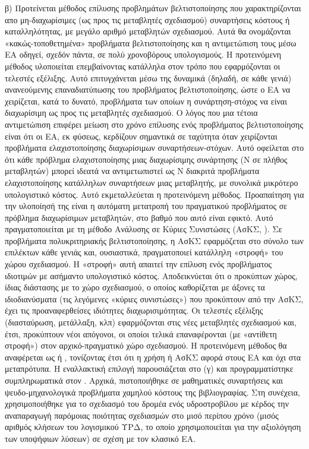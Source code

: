 	β)  Προτείνεται μέθοδος επίλυσης προβλημάτων βελτιστοποίησης που χαρακτηρίζονται απο μη-διαχωρίσιμες (ως προς τις μεταβλητές σχεδιασμού) συναρτήσεις κόστους ή καταλληλότητας, με μεγάλο αριθμό μεταβλητών σχεδιασμού. Αυτά θα ονομάζονται «κακώς-τοποθετημένα» προβλήματα βελτιστοποίησης και η αντιμετώπιση τους μέσω ΕΑ οδηγεί, σχεδόν πάντα, σε πολύ χρονοβόρους υπολογισμούς. Η προτεινόμενη μέθοδος υλοποιείται επεμβαίνοντας κατάλληλα στον τρόπο που εφαρμόζονται οι τελεστές εξέλιξης.  Αυτό επιτυγχάνεται μέσω της δυναμικά (δηλαδή, σε κάθε γενιά) ανανεούμενης επαναδιατύπωσης του προβλήματος βελτιστοποίησης, ώστε ο ΕΑ να χειρίζεται, κατά το δυνατό, προβλήματα των οποίων η συνάρτηση-στόχος να είναι διαχωρίσιμη ως προς τις μεταβλητές σχεδιασμού. Ο λόγος που μια τέτοια αντιμετώπιση επιφέρει μείωση στο χρόνο επίλυσης ενός προβλήματος βελτιστοποίησης είναι ότι οι ΕΑ, εκ φύσεως, κερδίζουν σημαντικά σε ταχύτητα όταν χειρίζονται προβλήματα ελαχιστοποίησης διαχωρίσιμων συναρτήσεων-στόχων. Αυτό οφείλεται στο ότι κάθε πρόβλημα ελαχιστοποίησης μιας διαχωρίσιμης συνάρτησης (Ν σε πλήθος μεταβλητών) μπορεί ιδεατά να αντιμετωπιστεί ως Ν διακριτά προβλήματα ελαχιστοποίησης κατάλληλων συναρτήσεων μιας μεταβλητής, με συνολικά μικρότερο υπολογιστικό κόστος.  Αυτό εκμεταλλεύεται η προτεινόμενη μέθοδος. Προαπαίτηση για την υλοποίησή της είναι η αυτόματη μετατροπή του πραγματικού προβλήματος σε πρόβλημα διαχωρίσιμων μεταβλητών, στο βαθμό που αυτό είναι εφικτό. Αυτό πραγματοποιείται με τη μέθοδο Ανάλυσης σε Κύριες Συνιστώσες \cite{Haykin,Jolliffe_2002} (ΑσΚΣ, ). Σε προβλήματα πολυκριτηριακής βελτιστοποίησης, η ΑσΚΣ εφαρμόζεται στο σύνολο των επιλέκτων κάθε γενιάς και, ουσιαστικά, πραγματοποιεί κατάλληλη «στροφή» του χώρου σχεδιασμού. Η «στροφή» αυτή απαιτεί την επίλυση ενός προβλήματος ιδιοτιμών με ασήμαντο υπολογιστικό κόστος. Αποδεικνύεται ότι ο προκύπτων χώρος, ίδιας διάστασης με το χώρο σχεδιασμού, ο οποίος καθορίζεται με άξονες τα ιδιοδιανύσματα (τις λεγόμενες «κύριες συνιστώσες») που προκύπτουν από την ΑσΚΣ, έχει τις προαναφερθείσες ιδιότητες διαχωρισιμότητας. Οι τελεστές εξέλιξης (διασταύρωση, μετάλλαξη, κλπ) εφαρμόζονται στις νέες μεταβλητές σχεδιασμού και, έτσι, προκύπτουν νέοι απόγονοι, οι οποίοι τελικά επαναφέρονται (με «αντίθετη στροφή») στον αρχικό-πραγματικό χώρο σχεδιασμού. Η προτεινόμενη μέθοδος θα αναφέρεται ως  ή , τονίζοντας έτσι ότι η χρήση  ή ΑσΚΣ αφορά στους ΕΑ και όχι στα μεταπρότυπα. Η εναλλακτική επιλογή παρουσιάζεται στο (γ) και προγραμματίστηκε συμπληρωματικά στον . Αρχικά, πιστοποιήθηκε σε μαθηματικές συναρτήσεις και ψευδο-μηχανολογικά προβλήματα χαμηλού κόστους της βιβλιογραφίας. Στη συνέχεια, χρησιμοποιήθηκε για το σχεδιασμό του δρομέα ενός υδροστροβίλου   με κέρδος την αναπαραγωγή παρόμοιας ποιότητας σχεδιασμών στο μισό περίπου χρόνο (μισός αριθμός κλήσεων του λογισμικού ΥΡΔ, το οποίο χρησιμοποιείται για την αξιολόγηση των υποψήφιων λύσεων) σε σχέση με τον κλασικό EA.  
 
